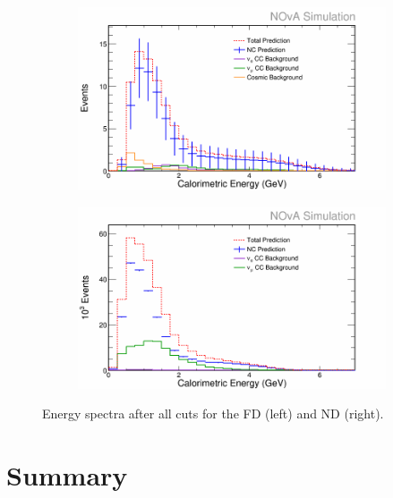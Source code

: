 \begin{figure}[h]
  \centering
  \begin{subfigure}{.48\textwidth}
    \centering
    \includegraphics[width=1\linewidth]{figures/RecoE5FD.png}
  \end{subfigure}
  \begin{subfigure}{.48\textwidth}
    \centering
    \includegraphics[width=1\linewidth]{figures/RecoE5ND.png}
  \end{subfigure}
  \caption[Energy Spectra After All Cuts]{Energy spectra after all cuts for the FD (left) and ND (right).}
  \label{fig:Sel}
\end{figure}

\section{Summary}

